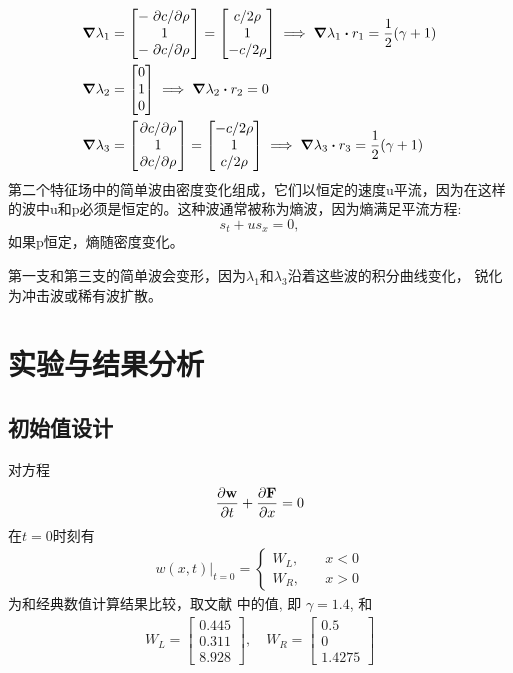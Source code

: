 \documentclass[10.5pt
]{article}
\begin{document}
\begin{equation}
	\begin{aligned}
		&\grad \lambda_1 = 
		\mqty[ -\pdv*{c}{\rho} \\ 1 \\ -\pdv*{c}{\rho} ]
		=
		\mqty[ c / 2\rho \\ 1 \\ - c / 2\rho ]
		\implies
		\grad \lambda_1 \vdot r_1 = \frac{1}{2} (\gamma +1) \\
		&\grad \lambda_2 = 
		\mqty[ 0 \\ 1 \\ 0 ]
		\implies
		\grad \lambda_2 \vdot r_2 = 0 \\
		&\grad \lambda_3 = 
		\mqty[ \pdv*{c}{\rho} \\ 1 \\ \pdv*{c}{\rho} ]
		=
		\mqty[ - c / 2\rho \\ 1 \\  c / 2\rho ]
		\implies
		\grad \lambda_3 \vdot r_3 = \frac{1}{2} (\gamma +1)
	\end{aligned}
\end{equation}
第二个特征场中的简单波由密度变化组成，它们以恒定的速度u平流，因为在这样的波中u和p必须是恒定的。这种波通常被称为熵波，因为熵满足平流方程:
\begin{equation}
	s_t + u s_x = 0,
\end{equation}
如果p恒定，熵随密度变化。

第一支和第三支的简单波会变形，因为$\lambda_1$和\(\lambda_3\)沿着这些波的积分曲线变化，
锐化为冲击波或稀有波扩散。
\section{实验与结果分析}
\subsection{初始值设计}
对方程
\begin{align}
\frac{\partial \vb w}{\partial t} + \frac{\partial \vb F}{\partial x} = 0
\end{align}
在$t = 0$时刻有
\begin{align}
w(x,t)|_{t=0} = \left\{ \begin{array}{ll}
W_L, & \quad x < 0 \\
W_R, & \quad x > 0
\end{array} \right.
\end{align}
为和经典数值计算结果比较，取文献 \citet{Harten1983} 中的值, 即 $\gamma=1.4$, 和
\begin{align}
    W_L = \left[\begin{array}{l}
    0.445\\
    0.311\\
    8.928
    \end{array}\right], \quad W_R = \left[\begin{array}{l}
    0.5\\
    0\\
    1.4275
    \end{array}\right]
\end{align}
\end{document}
